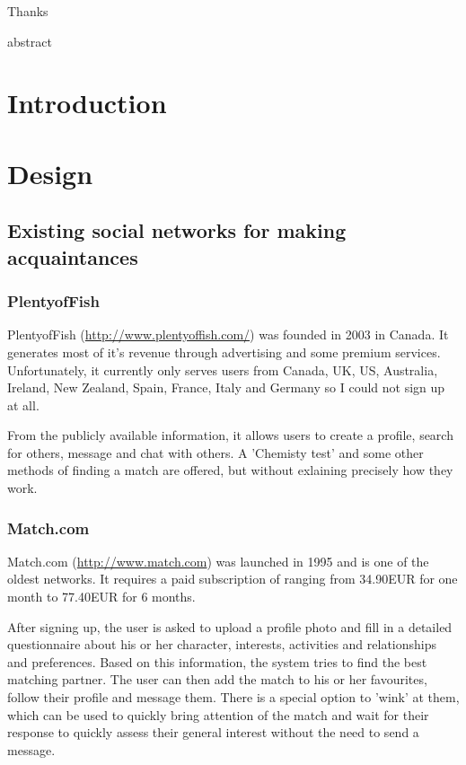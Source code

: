 \documentclass[11pt,draft,oneside]{fithesis}
\begin{document}
\FrontMatter
\ThesisTitlePage

\begin{ThesisDeclaration}
\DeclarationText
\AdvisorName
\end{ThesisDeclaration}

\begin{ThesisThanks}
Thanks
\end{ThesisThanks}

abstract

\MainMatter
\tableofcontents
\chapter*{Introduction}
\chapter{Design}
\section{Existing social networks for making acquaintances}
	\subsection{PlentyofFish}
		PlentyofFish (\url{http://www.plentyoffish.com/}) was founded in 2003 in Canada. It generates most of it's revenue through advertising and some premium services. Unfortunately, it currently only serves users from Canada, UK, US, Australia, Ireland, New Zealand, Spain, France, Italy and Germany so I could not sign up at all.
		
		From the publicly available information, it allows users to create a profile, search for others, message and chat with others. A 'Chemisty test' and some other methods of finding a match are offered, but without exlaining precisely how they work.\cite{website:pof}
		\subsection{Match.com}
		Match.com (\url{http://www.match.com}) was launched in 1995 and is one of the oldest networks. It requires a paid subscription of ranging from 34.90EUR for one month  to 77.40EUR for 6 months.
		
		After signing up, the user is asked to upload a profile photo and fill in a detailed questionnaire about his or her character, interests, activities and relationships and preferences. Based on this information, the system tries to find the best matching partner. The user can then add the match to his or her favourites, follow their profile and message them. There is a special option to 'wink' at them, which can be used to quickly bring attention of the match and wait for their response to quickly assess their general interest without the need to send a message.\cite{website:match}
		
\end{document}
